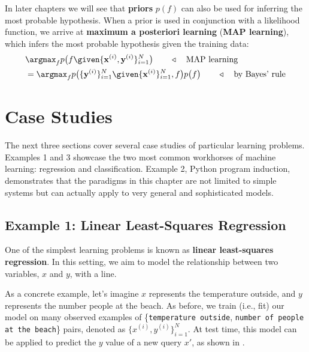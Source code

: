 In later chapters we will see that \textbf{priors} $p(f)$ can also be used for inferring the most probable hypothesis. When a prior is used in conjunction with a likelihood function, we arrive at \textbf{maximum a posteriori learning} (\textbf{MAP learning}), which infers the most probable hypothesis given the training data:
\begin{align}
    &\argmax_f p\big(f \given \{\mathbf{x}^{(i)}, \mathbf{y}^{(i)}\}_{i=1}^N\big) \quad\quad \triangleleft \quad \text{MAP learning}\\
    & = \argmax_f p\big(\{\mathbf{y}^{(i)}\}_{i=1}^N \given \{\mathbf{x}^{(i)}\}_{i=1}^N, f\big)p\big(f\big) \quad\quad \triangleleft \quad \text{by Bayes' rule}
\end{align}







\section{Case Studies}
The next three sections cover several case studies of particular learning problems. Examples 1 and 3 showcase the two most common workhorses of machine learning: regression and classification. Example 2, Python program induction, demonstrates that the paradigms in this chapter are not limited to simple systems but can actually apply to very general and sophisticated models.

\subsection{Example 1: Linear Least-Squares Regression}\label{sec:intro_to_learning:least_squares}
One of the simplest learning problems is known as \textbf{linear least-squares regression}. In this setting, we aim to model the relationship between two variables, $x$ and $y$, with a line. 

As a concrete example, let's imagine $x$ represents the temperature outside, and $y$ represents the number people at the beach. As before, we train (i.e., fit) our model on many observed examples of \{\texttt{temperature outside}, \texttt{number of people at the beach}\} pairs, denoted as $\{x^{(i)},y^{(i)}\}_{i=1}^N$. At test time, this model can be applied to predict the $y$ value of a new query $x'$, as shown in \fig{\ref{fig:intro_to_learning:ols_train_test}}.


